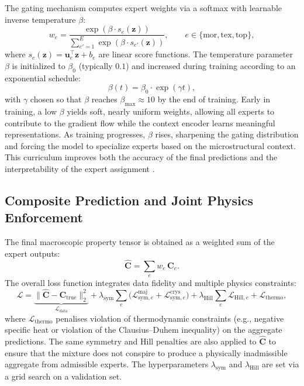 \documentclass{article}
\begin{document}
The gating mechanism computes expert weights via a softmax with learnable inverse temperature \(\beta\):
\begin{equation}
    w_e = \frac{\exp(\beta \cdot s_e(\mathbf{z}))}{\sum_{e'=1}^{E} \exp(\beta \cdot s_{e'}(\mathbf{z}))},\qquad e \in \{\text{mor}, \text{tex}, \text{top}\},
    \label{eq:gating}
\end{equation}
where \(s_e(\mathbf{z}) = \mathbf{u}_e^{\!\top}\mathbf{z} + b_e\) are linear score functions. The temperature parameter \(\beta\) is initialized to \(\beta_0\) (typically \(0.1\)) and increased during training according to an exponential schedule:
\begin{equation}
    \beta(t) = \beta_0 \cdot \exp(\gamma t),
    \label{eq:anneal}
\end{equation}
with \(\gamma\) chosen so that \(\beta\) reaches \(\beta_{\text{max}} \approx 10\) by the end of training. Early in training, a low \(\beta\) yields soft, nearly uniform weights, allowing all experts to contribute to the gradient flow while the context encoder learns meaningful representations. As training progresses, \(\beta\) rises, sharpening the gating distribution and forcing the model to specialize experts based on the microstructural context. This curriculum improves both the accuracy of the final predictions and the interpretability of the expert assignment \cite{jacobs1991adaptive}.

\subsection{Composite Prediction and Joint Physics Enforcement}
\label{sec:composite}

The final macroscopic property tensor is obtained as a weighted sum of the expert outputs:
\begin{equation}
    \widehat{\mathbf{C}} = \sum_{e} w_e \, \mathbf{C}_e .
    \label{eq:aggregate}
\end{equation}
The overall loss function integrates data fidelity and multiple physics constraints:
\begin{equation}
    \mathcal{L} = \underbrace{\|\widehat{\mathbf{C}} - \mathbf{C}_{\text{true}}\|_2^2}_{\mathcal{L}_{\text{data}}} 
    + \lambda_{\text{sym}}\!\sum_{e} \bigl(\mathcal{L}_{\text{sym},e}^{\mathrm{maj}} + \mathcal{L}_{\text{sym},e}^{\mathrm{crys}}\bigr)
    + \lambda_{\text{Hill}}\!\sum_{e} \mathcal{L}_{\text{Hill},e}
    + \mathcal{L}_{\text{thermo}},
    \label{eq:loss}
\end{equation}
where \(\mathcal{L}_{\text{thermo}}\) penalises violation of thermodynamic constraints (e.g., negative specific heat or violation of the Clausius–Duhem inequality) on the aggregate predictions. The same symmetry and Hill penalties are also applied to \(\widehat{\mathbf{C}}\) to ensure that the mixture does not conspire to produce a physically inadmissible aggregate from admissible experts. The hyperparameters \(\lambda_{\text{sym}}\) and \(\lambda_{\text{Hill}}\) are set via a grid search on a validation set.
\end{document}

